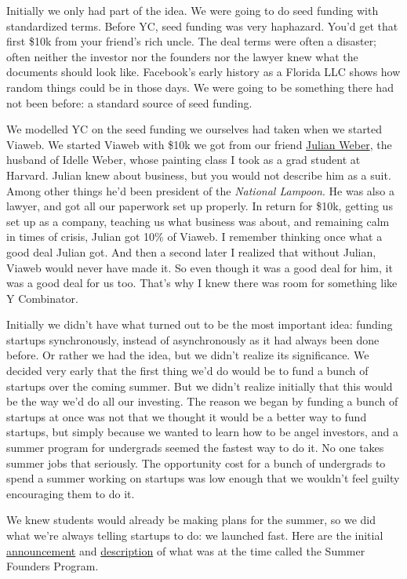\documentclass[12pt]{book}
\begin{document}
Initially we only had part of the idea. We were going to do seed funding
with standardized terms. Before YC, seed funding was very haphazard.
You'd get that first \$10k from your friend's rich uncle. The deal terms
were often a disaster; often neither the investor nor the founders nor
the lawyer knew what the documents should look like. Facebook's early
history as a Florida LLC shows how random things could be in those days.
We were going to be something there had not been before: a standard
source of seed funding.

We modelled YC on the seed funding we ourselves had taken when we
started Viaweb. We started Viaweb with \$10k we got from our friend
\href{julian.html}{Julian Weber}, the husband of Idelle Weber, whose
painting class I took as a grad student at Harvard. Julian knew about
business, but you would not describe him as a suit. Among other things
he'd been president of the \emph{National Lampoon}. He was also a
lawyer, and got all our paperwork set up properly. In return for \$10k,
getting us set up as a company, teaching us what business was about, and
remaining calm in times of crisis, Julian got 10\% of Viaweb. I remember
thinking once what a good deal Julian got. And then a second later I
realized that without Julian, Viaweb would never have made it. So even
though it was a good deal for him, it was a good deal for us too. That's
why I knew there was room for something like Y Combinator.

Initially we didn't have what turned out to be the most important idea:
funding startups synchronously, instead of asynchronously as it had
always been done before. Or rather we had the idea, but we didn't
realize its significance. We decided very early that the first thing
we'd do would be to fund a bunch of startups over the coming summer. But
we didn't realize initially that this would be the way we'd do all our
investing. The reason we began by funding a bunch of startups at once
was not that we thought it would be a better way to fund startups, but
simply because we wanted to learn how to be angel investors, and a
summer program for undergrads seemed the fastest way to do it. No one
takes summer jobs that seriously. The opportunity cost for a bunch of
undergrads to spend a summer working on startups was low enough that we
wouldn't feel guilty encouraging them to do it.

We knew students would already be making plans for the summer, so we did
what we're always telling startups to do: we launched fast. Here are the
initial \href{summerfounder.html}{announcement} and
\href{https://web.archive.org/web/20170609055553/http://ycombinator.com/old/sfp.html}{description}
of what was at the time called the Summer Founders Program.
\end{document}
